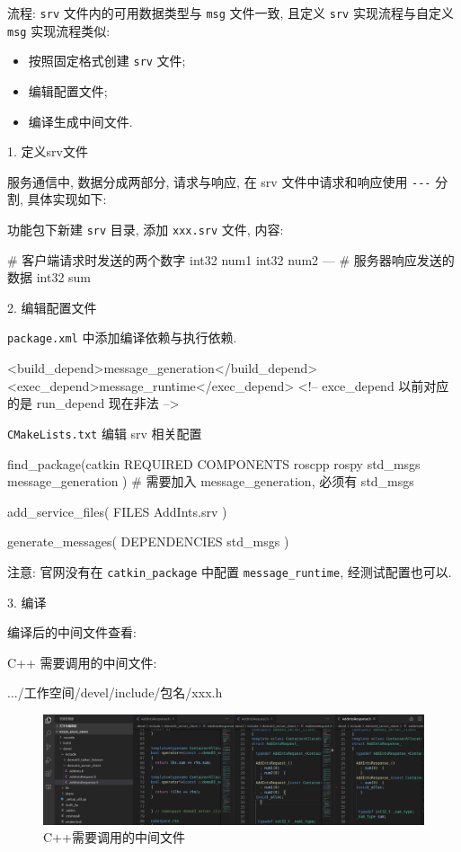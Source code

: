 \documentclass[openany, fontset=windowsold]{ctexbook}
\theoremstyle{kaiti}
\theoremstyle{normal}
\begin{document}
流程: \verb|srv| 文件内的可用数据类型与 \verb|msg| 文件一致, 且定义 \verb|srv| 实现流程与自定义 \verb|msg| 实现流程类似:

\begin{itemize}
  \item 按照固定格式创建 \verb|srv| 文件;
  \item 编辑配置文件;
  \item 编译生成中间文件.
\end{itemize}

1. 定义srv文件

服务通信中, 数据分成两部分, 请求与响应, 在 srv 文件中请求和响应使用 \verb|---| 分割, 具体实现如下:

功能包下新建 \verb|srv| 目录, 添加 \verb|xxx.srv| 文件, 内容:

\begin{bash}
  # 客户端请求时发送的两个数字
  int32 num1
  int32 num2
  ---
  # 服务器响应发送的数据
  int32 sum
\end{bash}

2. 编辑配置文件

\verb|package.xml| 中添加编译依赖与执行依赖.

\begin{xml}
  <build_depend>message_generation</build_depend>
  <exec_depend>message_runtime</exec_depend>
  <!-- exce_depend 以前对应的是 run_depend 现在非法 -->
\end{xml}

\verb|CMakeLists.txt| 编辑 srv 相关配置

\begin{bash}
  find_package(catkin REQUIRED COMPONENTS
    roscpp
    rospy
    std_msgs
    message_generation
  )
  # 需要加入 message_generation, 必须有 std_msgs

  add_service_files(
    FILES
    AddInts.srv
  )

  generate_messages(
    DEPENDENCIES
    std_msgs
  )
\end{bash}

注意: 官网没有在 \verb|catkin_package| 中配置 \verb|message_runtime|, 经测试配置也可以.

3. 编译

编译后的中间文件查看:

C++ 需要调用的中间文件:

\begin{bash}
  .../工作空间/devel/include/包名/xxx.h
\end{bash}

\begin{figure}[!ht]
  \centering
  \includegraphics[width=.9\textwidth]{customized_srv_vscode_cpp.png}
  \caption{C++需要调用的中间文件}
  \label{fig:cusomized_srv_vscode_cpp}
\end{figure}
\end{document}
